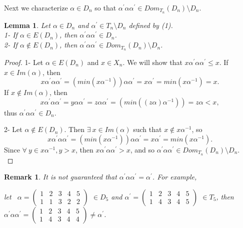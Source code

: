 \documentclass[10pt]{extarticle}
\numberwithin{equation}{section}
\numberwithin{bbb}{section}
\newtheorem{remark}{Remark}[section]
\newtheorem{lemma}{Lemma}[section]
\numberwithin{equation}{section}
\begin{document}
Next we characterize $\alpha \in D_n$ so that $\alpha^{\prime}\alpha\alpha^{\prime} \in Dom_{T_n}(D_n) \setminus D_n$.

\begin{lemma}
Let $\alpha \in D_n$ and $\alpha^{\prime} \in T_n \setminus D_n$ defined by (1).\\
1- If $\alpha \in E(D_n)$, then $\alpha^{\prime}\alpha\alpha^{\prime} \in D_n$.\\
2- If $\alpha \notin E(D_n)$, then $\alpha^{\prime}\alpha\alpha^{\prime} \in Dom_{T_n}(D_n) \setminus D_n$.
\end{lemma}

\begin{proof}
   1- Let $\alpha \in E(D_n)$ and $x \in X_n$. We will show that $x\alpha^{\prime}\alpha\alpha^{\prime} \leq x$. If $x \in Im(\alpha)$, then 
   $$x \alpha^{\prime}\alpha\alpha^{\prime} =(min(x\alpha^{-1}))\alpha\alpha^{\prime}=x\alpha^{\prime}=min(x\alpha^{-1})=x.$$
   If $x \notin Im(\alpha)$, then 
   $$x \alpha^{\prime}\alpha\alpha^{\prime} =y\alpha\alpha^{\prime}=z\alpha\alpha^{\prime}=(min((z\alpha)\alpha^{-1}))=z\alpha < x,$$
   thus    $\alpha^{\prime}\alpha\alpha^{\prime}\in D_n$.

\vspace{0.5cm}
2- Let $\alpha \notin E(D_n)$. Then $\exists \ x \in Im(\alpha)$ such that $x \notin x\alpha^{-1}$,
   so
   $$x \alpha^{\prime}\alpha\alpha^{\prime}=(min(x\alpha^{-1}))\alpha\alpha^{\prime}=x\alpha^{\prime}=min (x\alpha^{-1}).$$ Since $\forall \ y \in x\alpha^{-1}, y >x$, then $x\alpha^{\prime}\alpha\alpha^{\prime} > x$,
  and so $\alpha^{\prime}\alpha\alpha^{\prime} \in Dom_{T_n}(D_n) \setminus D_n$.\\
  \end{proof}

  \vspace{0.2cm}
  \begin{remark}
It is not guaranteed that $\alpha^{\prime}\alpha\alpha^{\prime}=\alpha^{\prime}$. For example,

\vspace{0.7cm}
let \
$\alpha=
\begin{pmatrix}  1&2&3&4&5\\1&1&3&2&2
\end{pmatrix}
$ $\in D_5$ and
$\alpha^{\prime}=
\begin{pmatrix}  1&2&3&4&5\\1&4&3&4&5
\end{pmatrix}$ $\in T_5$,
then  
$\alpha^{\prime}\alpha\alpha^{\prime}=
\begin{pmatrix}  1&2&3&4&5\\1&4&3&4&4
\end{pmatrix}
$$\neq \alpha^{\prime}$.
\end{remark}
\end{document}
